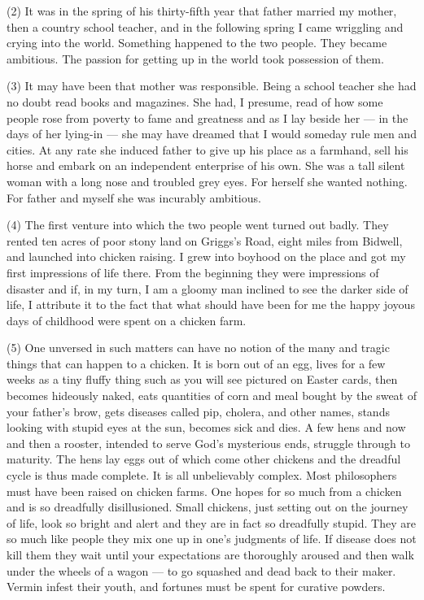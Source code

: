 \documentclass[UTF8,11pt]{ctexart}
\begin{document}
(2) It was in the spring of his thirty-fifth year that father married my mother, then a country school teacher, and in the following spring I came wriggling and crying into the world. Something happened to the two people. They became ambitious. The passion for getting up in the world took possession of them.


(3) It may have been that mother was responsible. Being a school teacher she had no doubt read books and magazines. She had, I presume, read of how some people rose from poverty to fame and greatness and as I lay beside her — in the days of her lying-in — she may have dreamed that I would someday rule men and cities. At any rate she induced father to give up his place as a farmhand, sell his horse and embark on an independent enterprise of his own. She was a tall silent woman with a long nose and troubled grey eyes. For herself she wanted nothing. For father and myself she was incurably ambitious.


(4) The first venture into which the two people went turned out badly. They rented ten acres of poor stony land on Griggs’s Road, eight miles from Bidwell, and launched into chicken raising. I grew into boyhood on the place and got my first impressions of life there. From the beginning they were impressions of disaster and if, in my turn, I am a gloomy man inclined to see the darker side of life, I attribute it to the fact that what should have been for me the happy joyous days of childhood were spent on a chicken farm.


(5) One unversed in such matters can have no notion of the many and tragic things that can happen to a chicken. It is born out of an egg, lives for a few weeks as a tiny fluffy thing such as you will see pictured on Easter cards, then becomes hideously naked, eats quantities of corn and meal bought by the sweat of your father’s brow, gets diseases called pip, cholera, and other names, stands looking with stupid eyes at the sun, becomes sick and dies. A few hens and now and then a rooster, intended to serve God’s mysterious ends, struggle through to maturity. The hens lay eggs out of which come other chickens and the dreadful cycle is thus made complete. It is all unbelievably complex. Most philosophers must have been raised on chicken farms. One hopes for so much from a chicken and is so dreadfully disillusioned. Small chickens, just setting out on the journey of life, look so bright and alert and they are in fact so dreadfully stupid. They are so much like people they mix one up in one’s judgments of life. If disease does not kill them they wait until your expectations are thoroughly aroused and then walk under the wheels of a wagon — to go squashed and dead back to their maker. Vermin infest their youth, and fortunes must be spent for curative powders.
\end{document}
